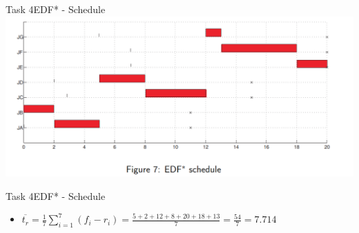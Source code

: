 \begin{frame}{Task 4}{EDF* - Schedule}
    \includegraphics[width = \linewidth]{figures/edf-star-schedule-2.PNG}
\end{frame}

\begin{frame}[allowframebreaks]{Task 4}{EDF* - Schedule}
  \begin{solution}
  \begin{itemize}
    \item $\displaystyle \overline{t_r}=\frac{1}{7} \sum_{i=1}^7\left(f_i-r_i\right)=\frac{5+2+12+8+20+18+13}{7}=\frac{54}{7}=7.714$
  \end{itemize}
  \end{solution}
\end{frame}

